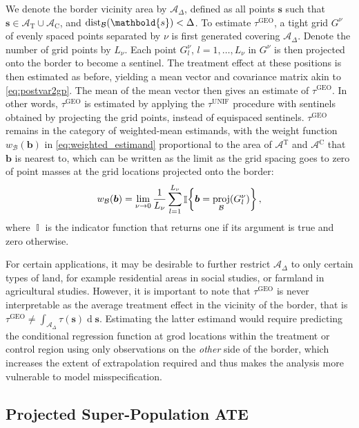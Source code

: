\documentclass[letter]{article}
\DeclarePairedDelimiter{\parenthesis}{\lparen}{\rparen}
\DeclarePairedDelimiter{\curlybracket}{\lbrace}{\rbrace}
\newcommand{\del}[1]{\parenthesis*{#1}}
\newcommand{\cbr}[1]{\curlybracket*{#1}}
\DeclareMathOperator{\dif}{d}
\DeclareMathOperator{\Ind}{\mathbb{I}}
\newcommand{\area}{\mathcal{A}}
\newcommand{\treat}{\mathrm{T}}
\newcommand{\ctrol}{\mathrm{C}}
\newcommand{\treatarea}{\area{}^{\treat}}
\newcommand{\ctrolarea}{\area{}^{\ctrol}}
\newcommand{\svec}{\mathbold{s}}
\newcommand{\border}{\mathcal{B}}
\newcommand{\sentinel}{\bm{b}}
\newcommand{\unifavg}{\tau^{\mathrm{UNIF}}}
\newcommand{\taugeo}{\tau^{\mathrm{GEO}}}
\DeclareMathOperator{\proj}{proj}
\DeclareMathOperator{\dist}{dist}
\newcommand{\buffer}{\Delta}
\newcommand{\weightb}{w_{\border}}
\newcommand{\gridres}{\nu}
\newcommand{\grid}{G^\gridres}
\begin{document}
We denote the border vicinity area by \(\area_\buffer\), defined as all points \(\svec\) such that \(\svec \in {\area_\treat \cup \area_\ctrol}\), and \(\dist_{\border}\del{\svec} < \buffer\).
To estimate \(\taugeo\), a tight grid \(\grid\) of evenly spaced points separated by \(\gridres\) is first generated covering \(\area_\buffer\).
Denote the number of grid points by \(L_\gridres\).
Each point \(\grid_l\), \(l=1,\dotsc,L_\gridres\) in \(\grid\) is then projected onto the border to become a sentinel.
The treatment effect at these positions is then estimated as before, yielding a mean vector and covariance matrix akin to \eqref{eq:postvar2gp}.
The mean of the mean vector then gives an estimate of \(\taugeo\).
In other words, \(\taugeo\) is estimated by applying the \(\unifavg\) procedure with sentinels obtained by projecting the grid points, instead of equispaced sentinels.
\(\taugeo\) remains in the category of weighted-mean estimands, with the weight function \(\weightb(\sentinel)\) in \eqref{eq:weighted_estimand} proportional to the area of \(\treatarea\) and \(\ctrolarea\) that \(\sentinel\) is nearest to, which can be written as the limit as the grid spacing goes to zero of point masses at the grid locations projected onto the border:
\begin{equation}
    \weightb(\sentinel) = \lim_{\gridres \rightarrow 0}\frac{1}{L_\gridres}\sum_{l=1}^{L_\gridres} \Ind\cbr{\sentinel = \proj_{\border}\del{\grid_l} }\,,
\end{equation}
where \(\Ind\) is the indicator function that returns one if its argument is true and zero otherwise.

For certain applications, it may be desirable to further restrict \(\area_\buffer\) to only certain types of land, for example residential areas in social studies, or farmland in agricultural studies.
However, it is important to note that \(\taugeo\) is never interpretable as the average treatment effect in the vicinity of the border, that is \(\taugeo \neq \int_{\area_\buffer} \tau(\svec) \dif \svec\).
Estimating the latter estimand would require predicting the conditional regression function at grod locations within the treatment or control region using only observations on the \emph{other} side of the border, which increases the extent of extrapolation required and thus makes the analysis more vulnerable to model misspecification.
    


    	\hypertarget{projected-super-population-ate}{%
\subsection{Projected Super-Population ATE}\label{projected-super-population-ate}}
\end{document}
